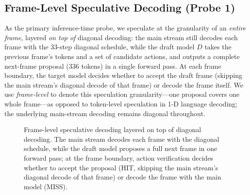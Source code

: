 \documentclass[10pt, twocolumn]{article}
\begin{document}
\subsection{Frame-Level Speculative Decoding (Probe 1)}
As the primary inference-time probe, we speculate at the granularity of an \emph{entire frame}, layered \emph{on top of} diagonal decoding: the main stream still decodes each frame with the 33-step diagonal schedule, while the draft model $D$ takes the previous frame's tokens and a set of candidate actions, and outputs a complete next-frame proposal (336 tokens) in a single forward pass. At each frame boundary, the target model decides whether to accept the draft frame (skipping the main stream's diagonal decode of that frame) or decode the frame itself. We use \emph{frame-level} to denote this speculation granularity---one proposal covers one whole frame---as opposed to token-level speculation in 1-D language decoding; the underlying main-stream decoding remains diagonal throughout.

\begin{figure}[t]
  \centering
  \small
  \caption{Frame-level speculative decoding layered on top of diagonal decoding. The main stream decodes each frame with the diagonal schedule, while the draft model proposes a full next frame in one forward pass; at the frame boundary, action verification decides whether to accept the proposal (HIT, skipping the main stream's diagonal decode of that frame) or decode the frame with the main model (MISS).}
  \label{fig:pipeline}
\end{figure}
\end{document}

